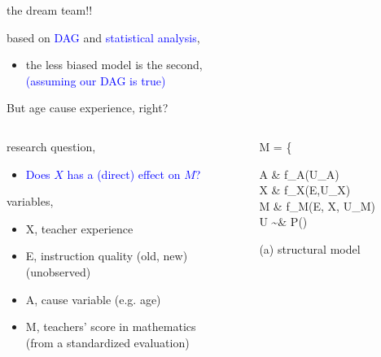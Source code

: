 %
%
\begin{lhframe}[rhgraphic={\texttt{[image: descendant1\_reg2.png]}}]
	{the dream team!!}
	
	based on \textcolor{blue}{DAG} and \textcolor{blue}{statistical analysis},
	\begin{itemize}
		\item the less biased model is the second, \\
		{\small \textcolor{blue}{(assuming our DAG is true)} }
	\end{itemize}
\end{lhframe}
%
%
\begin{frame}
	{But age cause experience, right?}
	\begin{columns}
		\begin{column}{0.5\textwidth}
			research question, 
			\begin{itemize}
				\item \textcolor{blue}{Does $X$ has a (direct) effect on $M$?}
			\end{itemize}
			
			variables,
			\begin{itemize}
				\item X, teacher experience
				\item E, instruction quality (old, new) \\
				{\small (unobserved)}
				\item A, cause variable (e.g. age)
				\item M, teachers' score in mathematics \\
				{\small (from a standardized evaluation)}
			\end{itemize}
		\end{column}
		\begin{column}{0.5\textwidth}  
			\begin{equ}
				M = \left\{ \begin{aligned} 
					A \leftarrow & \; f_{A}(U_{A}) \\
					X \leftarrow & \; f_{X}(E,U_{X}) \\
					M \leftarrow & \; f_{M}(E, X, U_{M})\\
					U \sim & \; P()
				\end{aligned} \right
				\caption*{(a) structural model}
			\end{equ}
			\begin{figure}
\end{figure}
\end{column}
\end{columns}
\end{frame}
